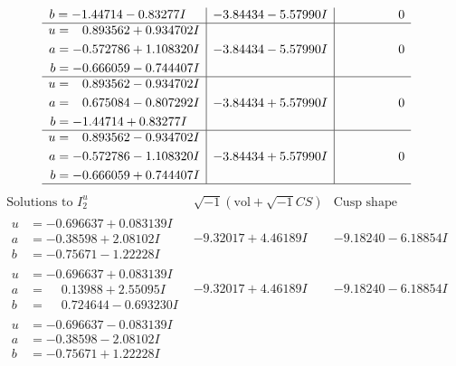 \documentclass[1p]{elsarticle_modified}
\theoremstyle{definition}
\newcommand{\I}{\sqrt{-1}}
\begin{document}
$$\begin{array}{c|c|c}
\begin{aligned}
b &= -1.44714 - 0.83277 I\end{aligned}
 & -3.84434 - 5.57990 I & \phantom{-0.000000 } 0 \\ \hline\begin{aligned}
u &= \phantom{-}0.893562 + 0.934702 I \\
a &= -0.572786 + 1.108320 I \\
b &= -0.666059 - 0.744407 I\end{aligned}
 & -3.84434 - 5.57990 I & \phantom{-0.000000 } 0 \\ \hline\begin{aligned}
u &= \phantom{-}0.893562 - 0.934702 I \\
a &= \phantom{-}0.675084 - 0.807292 I \\
b &= -1.44714 + 0.83277 I\end{aligned}
 & -3.84434 + 5.57990 I & \phantom{-0.000000 } 0 \\ \hline\begin{aligned}
u &= \phantom{-}0.893562 - 0.934702 I \\
a &= -0.572786 - 1.108320 I \\
b &= -0.666059 + 0.744407 I\end{aligned}
 & -3.84434 + 5.57990 I & \phantom{-0.000000 } 0\\
 \hline 
 \end{array}$$\newpage$$\begin{array}{c|c|c}  
\text{Solutions to }I^u_{2}& \I (\text{vol} + \sqrt{-1}CS) & \text{Cusp shape}\\
 \hline 
\begin{aligned}
u &= -0.696637 + 0.083139 I \\
a &= -0.38598 + 2.08102 I \\
b &= -0.75671 - 1.22228 I\end{aligned}
 & -9.32017 + 4.46189 I & -9.18240 - 6.18854 I \\ \hline\begin{aligned}
u &= -0.696637 + 0.083139 I \\
a &= \phantom{-}0.13988 + 2.55095 I \\
b &= \phantom{-}0.724644 - 0.693230 I\end{aligned}
 & -9.32017 + 4.46189 I & -9.18240 - 6.18854 I \\ \hline\begin{aligned}
u &= -0.696637 - 0.083139 I \\
a &= -0.38598 - 2.08102 I \\
b &= -0.75671 + 1.22228 I\end{aligned}

\end{array}$$
\end{document}
